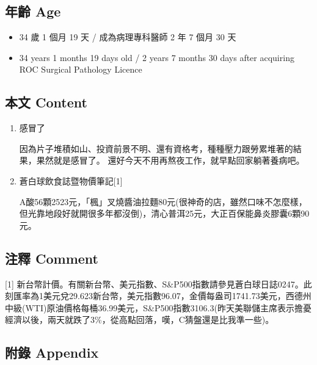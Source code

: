 \documentclass[a5paper, 11pt
]{book}
\providecommand{\tightlist}{%
  \setlength{\itemsep}{0pt}\setlength{\parskip}{0pt}}
\begin{document}
\hypertarget{ux5e74ux9f61-age-10}{%
\subsection{年齡 Age}\label{ux5e74ux9f61-age-10}}

\begin{itemize}
\tightlist
\item
  34 歲 1 個月 19 天 / 成為病理專科醫師 2 年 7 個月 30 天
\item
  34 years 1 months 19 days old / 2 years 7 months 30 days after
  acquiring ROC Surgical Pathology Licence
\end{itemize}

\hypertarget{ux672cux6587-content-10}{%
\subsection{本文 Content}\label{ux672cux6587-content-10}}

\begin{enumerate}
\def\labelenumi{\arabic{enumi}.}
\item
  感冒了

  因為片子堆積如山、投資前景不明、還有資格考，種種壓力跟勞累堆著的結果，果然就是感冒了。
  還好今天不用再熬夜工作，就早點回家躺著養病吧。
\item
  蒼白球飲食誌暨物價筆記{[}1{]}

  A酸56顆2523元，「楓」叉燒醬油拉麵80元(很神奇的店，雖然口味不怎麼樣，但光靠地段好就開很多年都沒倒)，清心普洱25元，大正百保能鼻炎膠囊6顆90元。
\end{enumerate}

\hypertarget{ux6ce8ux91cb-comment-10}{%
\subsection{注釋 Comment}\label{ux6ce8ux91cb-comment-10}}

{[}1{]}
新台幣計價。有關新台幣、美元指數、S\&P500指數請參見蒼白球日誌0247。此刻匯率為1美元兌29.623新台幣，美元指數96.07，金價每盎司1741.73美元，西德州中級(WTI)原油價格每桶36.99美元，S\&P500指數3106.3(昨天美聯儲主席表示擔憂經濟以後，兩天就跌了3\%，從高點回落，嘆，C猜盤還是比我準一些)。

\hypertarget{ux9644ux9304-appendix-10}{%
\subsection{附錄 Appendix}\label{ux9644ux9304-appendix-10}}
\end{document}

